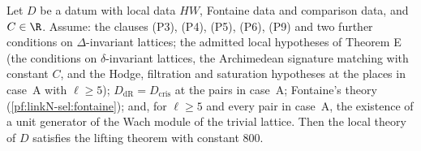 \begin{theorem}[Theorem E]\label{pf:linkN-sel:thmEcore}
Let $D$ be a datum with local data $HW$, Fontaine data and comparison data, and $C\in\R$. Assume: the clauses (P3), (P4), (P5), (P6), (P9) and two
further conditions on $\Delta$-invariant lattices; the admitted local hypotheses of Theorem E (the conditions on $\delta$-invariant lattices, the
Archimedean signature matching with constant $C$, and the Hodge, filtration and saturation hypotheses at the places in case~A with $\ell\ge5$);
$D_{\mathrm{dR}}=D_{\mathrm{cris}}$ at the pairs in case~A; Fontaine's theory (\cref{pf:linkN-sel:fontaine}); and, for $\ell\ge5$ and every pair in
case~A, the existence of a unit generator of the Wach module of the trivial lattice. Then the local theory of $D$ satisfies the lifting theorem
with constant $800$.
\end{theorem}

